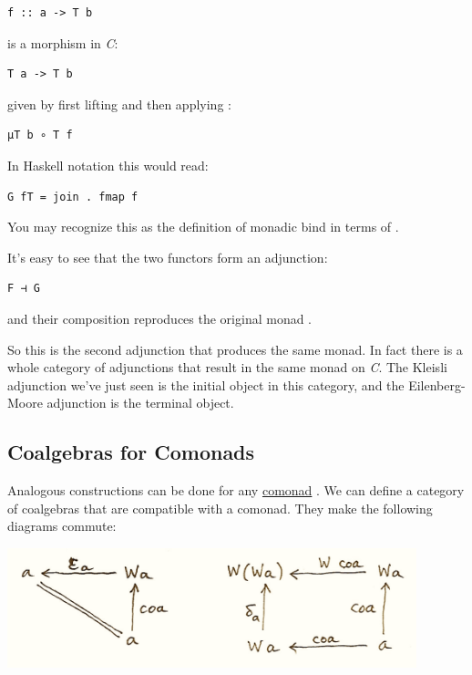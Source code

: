\begin{verbatim}
f :: a -> T b
\end{verbatim}

is a morphism in \emph{C}:

\begin{verbatim}
T a -> T b
\end{verbatim}

given by first lifting  and then applying :

\begin{verbatim}
μT b ∘ T f
\end{verbatim}

In Haskell notation this would read:

\begin{verbatim}
G fT = join . fmap f
\end{verbatim}

You may recognize this as the definition of monadic bind in terms of
.

It's easy to see that the two functors form an adjunction:

\begin{verbatim}
F ⊣ G
\end{verbatim}

and their composition  reproduces the original monad
.

So this is the second adjunction that produces the same monad. In fact
there is a whole category of adjunctions  that result
in the same monad  on \emph{C}. The Kleisli adjunction we've
just seen is the initial object in this category, and the
Eilenberg-Moore adjunction is the terminal object.

\subsection{Coalgebras for Comonads}\label{coalgebras-for-comonads}

Analogous constructions can be done for any
\href{https://bartoszmilewski.com/2017/01/02/comonads/}{comonad}
. We can define a category of coalgebras that are compatible
with a comonad. They make the following diagrams commute:

\includegraphics[width=4.67708in]{images/talg5.png}

